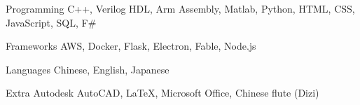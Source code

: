 
\begin{cvskills}
  \cvskill
    {Programming} %
    {C++, Verilog HDL, Arm Assembly, Matlab, Python, HTML, CSS, JavaScript, SQL, F\#} %

  \cvskill
    {Frameworks} %
    {AWS, Docker, Flask, Electron, Fable, Node.js} %
    
  \cvskill
    {Languages}
    {Chinese, English, Japanese}
    
  \cvskill
    {Extra} %
    {Autodesk AutoCAD, LaTeX, Microsoft Office, Chinese flute (Dizi)} %
\end{cvskills}
